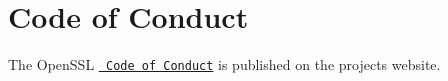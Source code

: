 \chapter{Code of Conduct}
\hypertarget{md__c_1_2_users_2namph_2_downloads_2openssl_2openssl-3_82_81_2_c_o_d_e-_o_f-_c_o_n_d_u_c_t}{}\label{md__c_1_2_users_2namph_2_downloads_2openssl_2openssl-3_82_81_2_c_o_d_e-_o_f-_c_o_n_d_u_c_t}
The Open\+SSL \href{https://www.openssl.org/community/conduct.html}{\texttt{ Code of Conduct}} is published on the project\textquotesingle{}s website. 